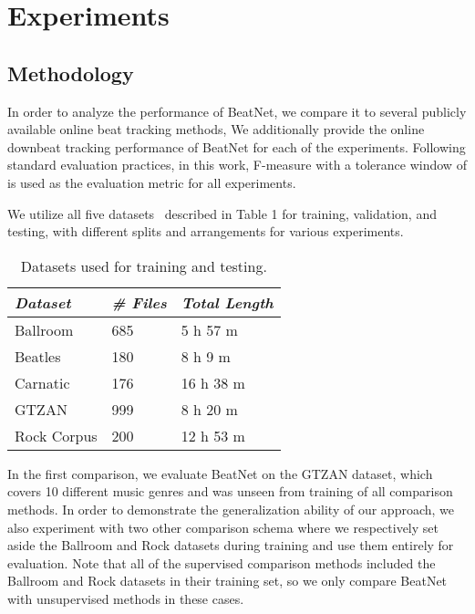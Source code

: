 \documentclass{article}
\begin{document}
\section{Experiments}
\subsection{Methodology}
In order to analyze the performance of BeatNet, we compare it to several publicly available online beat tracking methods, We additionally provide the online downbeat tracking performance of BeatNet for each of the experiments. Following standard evaluation practices, in this work, F-measure with a tolerance window of  is used as the evaluation metric for all experiments.


We utilize all five datasets~\cite{Gouyon:2,Krebs:4,davis,Srinivasamurthy,Marchand,Tzanetakis,Clercq} described in Table 1 for training, validation, and testing, with different splits and arrangements for various experiments.
\begin{table}[t]
  \begin{center}
    \begin{tabular}{L{0.30\columnwidth}C{0.20\columnwidth}C{0.25\columnwidth}}
        \hline
        \textit{Dataset} & \textit{\# Files} & \textit{Total Length} \\
        \hline
        \small Ballroom \cite{Gouyon:2,Krebs:4} & \small 685 & \small 5 h 57 m \\
        \hline
        \small Beatles \cite{davis} & \small 180 & \small 8 h 9 m \\
        \hline
        \small Carnatic \cite{Srinivasamurthy} & \small 176 & \small 16 h 38 m \\
        \hline
        \small GTZAN \cite{Marchand,Tzanetakis} & \small 999 & \small 8 h 20 m \\
        \hline
        \small Rock Corpus \cite{Clercq} & \small 200 & \small 12 h 53 m \\
        \hline
    \end{tabular}
    \caption{Datasets used for training and testing.}
    \label{tab:results}
  \end{center}
\end{table}
In the first comparison, we evaluate BeatNet on the GTZAN dataset, which covers 10 different music genres and was unseen from training of all comparison methods.  In order to demonstrate the generalization ability of our approach, we also experiment with two other comparison schema where we respectively set aside the Ballroom and Rock datasets during training and use them entirely for evaluation. Note that all of the supervised comparison methods included the Ballroom and Rock datasets in their training set, so we only compare BeatNet with unsupervised methods in these cases.
\end{document}
